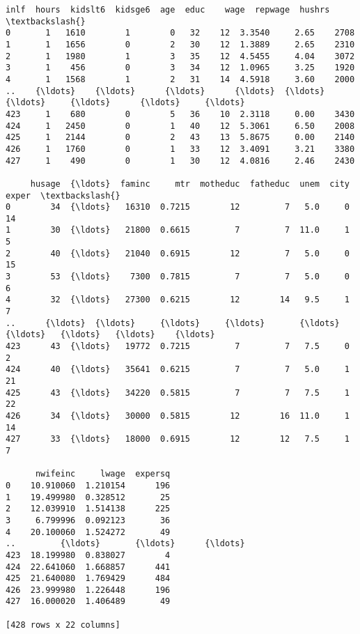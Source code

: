 \documentclass[11pt]{article}
\makeatletter
\newcommand{\boxspacing}{\kern\kvtcb@left@rule\kern\kvtcb@boxsep}
\newcommand{\prompt}[4]{
        {\ttfamily\llap{{\color{#2}[#3]:\hspace{3pt}#4}}\vspace{-\baselineskip}}
    }
\makeatother
\begin{document}
            \begin{tcolorbox}[breakable, size=fbox, boxrule=.5pt, pad at break*=1mm, opacityfill=0]
\prompt{Out}{outcolor}{7}{\boxspacing}
\begin{Verbatim}[commandchars=\\\{\}]
     inlf  hours  kidslt6  kidsge6  age  educ    wage  repwage  hushrs  \textbackslash{}
0       1   1610        1        0   32    12  3.3540     2.65    2708
1       1   1656        0        2   30    12  1.3889     2.65    2310
2       1   1980        1        3   35    12  4.5455     4.04    3072
3       1    456        0        3   34    12  1.0965     3.25    1920
4       1   1568        1        2   31    14  4.5918     3.60    2000
..    {\ldots}    {\ldots}      {\ldots}      {\ldots}  {\ldots}   {\ldots}     {\ldots}      {\ldots}     {\ldots}
423     1    680        0        5   36    10  2.3118     0.00    3430
424     1   2450        0        1   40    12  5.3061     6.50    2008
425     1   2144        0        2   43    13  5.8675     0.00    2140
426     1   1760        0        1   33    12  3.4091     3.21    3380
427     1    490        0        1   30    12  4.0816     2.46    2430

     husage  {\ldots}  faminc     mtr  motheduc  fatheduc  unem  city  exper  \textbackslash{}
0        34  {\ldots}   16310  0.7215        12         7   5.0     0     14
1        30  {\ldots}   21800  0.6615         7         7  11.0     1      5
2        40  {\ldots}   21040  0.6915        12         7   5.0     0     15
3        53  {\ldots}    7300  0.7815         7         7   5.0     0      6
4        32  {\ldots}   27300  0.6215        12        14   9.5     1      7
..      {\ldots}  {\ldots}     {\ldots}     {\ldots}       {\ldots}       {\ldots}   {\ldots}   {\ldots}    {\ldots}
423      43  {\ldots}   19772  0.7215         7         7   7.5     0      2
424      40  {\ldots}   35641  0.6215         7         7   5.0     1     21
425      43  {\ldots}   34220  0.5815         7         7   7.5     1     22
426      34  {\ldots}   30000  0.5815        12        16  11.0     1     14
427      33  {\ldots}   18000  0.6915        12        12   7.5     1      7

      nwifeinc     lwage  expersq
0    10.910060  1.210154      196
1    19.499980  0.328512       25
2    12.039910  1.514138      225
3     6.799996  0.092123       36
4    20.100060  1.524272       49
..         {\ldots}       {\ldots}      {\ldots}
423  18.199980  0.838027        4
424  22.641060  1.668857      441
425  21.640080  1.769429      484
426  23.999980  1.226448      196
427  16.000020  1.406489       49

[428 rows x 22 columns]
\end{Verbatim}
\end{tcolorbox}
        
\end{document}
